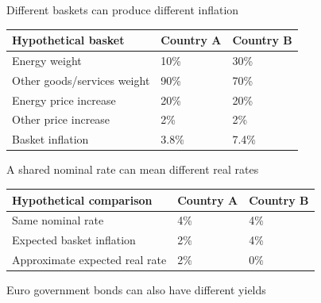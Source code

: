 \documentclass[12pt,aspectratio=169]{beamer}
\begin{document}
\begin{frame}{Different baskets can produce different inflation}
\begin{center}\begin{tabular}{@{}lll@{}}\toprule \textbf{Hypothetical basket} & \textbf{Country A} & \textbf{Country B}\\\midrule Energy weight & 10\% & 30\%\\[2mm]
Other goods/services weight & 90\% & 70\%\\[2mm]
Energy price increase & 20\% & 20\%\\[2mm]
Other price increase & 2\% & 2\%\\[2mm]
Basket inflation & 3.8\% & 7.4\%\\\bottomrule\end{tabular}\end{center}
\end{frame}


\begin{frame}{A shared nominal rate can mean different real rates}
\begin{center}\begin{tabular}{@{}lll@{}}\toprule \textbf{Hypothetical comparison} & \textbf{Country A} & \textbf{Country B}\\\midrule Same nominal rate & 4\% & 4\%\\[2mm]
Expected basket inflation & 2\% & 4\%\\[2mm]
Approximate expected real rate & 2\% & 0\%\\\bottomrule\end{tabular}\end{center}
\end{frame}


\begin{frame}{Euro government bonds can also have different yields}
\end{frame}
\end{document}
